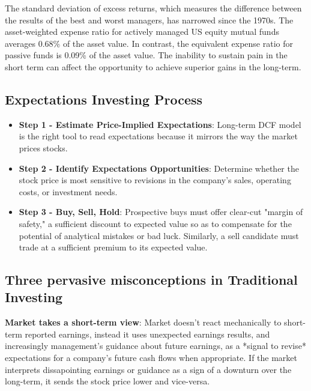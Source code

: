 \documentclass[english,titlepage]{article}
\begin{document}
\newline The standard deviation of excess returns, which measures the difference between the results of the best and worst managers, has narrowed since the 1970s.
\vspace {0.3 cm}
  \newline The asset-weighted expense ratio for actively managed US equity mutual funds averages 0.68\% of the asset value. In contrast, the equivalent expense ratio for passive funds is 0.09\% of the asset value. 
  \vspace {0.3 cm}
  \newline The inability to sustain pain in the short term can affect the opportunity to achieve superior gains in the long-term.
\subsection{Expectations Investing Process}
\begin{itemize}
    \item \textbf{Step 1 -  Estimate Price-Implied Expectations}: Long-term DCF model is the right tool to read expectations because it mirrors the way the market prices stocks. 
    \item \textbf{Step 2 - Identify Expectations Opportunities}: Determine whether the stock price is most sensitive to revisions in the company's sales, operating costs, or investment needs. 
    \item \textbf{Step 3 - Buy, Sell, Hold}: Prospective buys must offer clear-cut "margin of safety," a sufficient discount to expected value so as to compensate for the potential of analytical mistakes or bad luck. Similarly, a sell candidate must trade at a sufficient premium to its expected value. 
\end{itemize}
\subsection{Three pervasive misconceptions in Traditional Investing}
\textbf{Market takes a short-term view}: Market doesn't react mechanically to short-term reported earnings, instead it uses unexpected earnings results, and increasingly management's guidance about future earnings, as a *signal to revise* expectations for a company's future cash flows when appropriate. If the market interprets dissapointing earnings or guidance as a sign of a downturn over the long-term, it sends the stock price lower and vice-versa. 
\end{document}
